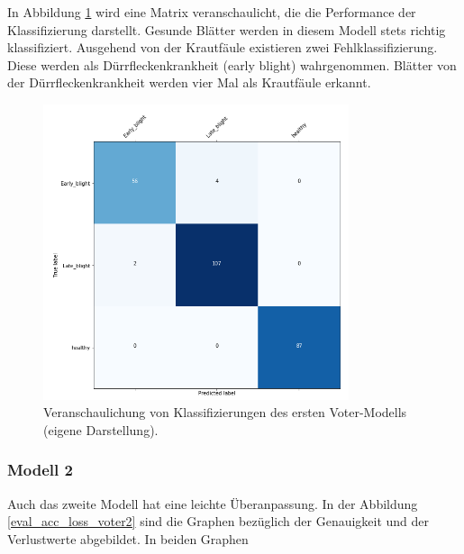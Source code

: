 In Abbildung \ref{voter1_cm} wird eine Matrix veranschaulicht, die die Performance der Klassifizierung darstellt. Gesunde Blätter werden in diesem Modell stets richtig klassifiziert. Ausgehend von der Krautfäule existieren zwei Fehlklassifizierung. Diese werden als Dürrfleckenkrankheit (early blight) wahrgenommen. Blätter von der Dürrfleckenkrankheit werden vier Mal als Krautfäule erkannt.

\begin{figure}[h!]
	\centering
	\includegraphics[width=0.8\textwidth]{model/voter1/voter1_cm.PNG}
	\caption{Veranschaulichung von Klassifizierungen des ersten Voter-Modells (eigene Darstellung).}
	\label{voter1_cm}
\end{figure}

\newpage
\subsubsection{Modell 2}

Auch das zweite Modell hat eine leichte Überanpassung. In der Abbildung \ref{eval_acc_loss_voter2} sind die Graphen bezüglich der Genauigkeit und der Verlustwerte abgebildet. In beiden Graphen

